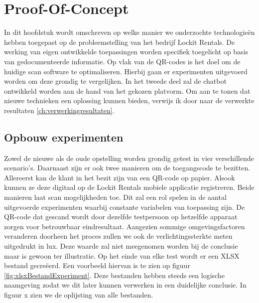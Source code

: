 

\chapter{Proof-Of-Concept}%
\label{ch:Proof-Of-Concept}


In dit hoofdstuk wordt omschreven op welke manier we onderzochte technologieën hebben toegepast op de probleemstelling van het bedrijf Lockit Rentals. De werking van eigen ontwikkelde toepassingen worden specifiek toegelicht op basis van gedocumenteerde informatie. Op vlak van de QR-codes is het doel om de huidige scan software te optimaliseren. Hierbij gaan er experimenten uitgevoerd worden om deze grondig te vergelijken. In het tweede deel zal de chatbot ontwikkeld worden aan de hand van het gekozen platvorm. Om aan te tonen dat nieuwe technieken een oplossing kunnen bieden, verwijs ik door naar de verwerkte resultaten \ref{ch:verwerkingresultaten}.

\section{Opbouw experimenten}%
\label{sec:toepassingenQR-coce scanners}

Zowel de nieuwe als de oude opstelling worden grondig getest in vier verschillende scenario’s. Daarnaast zijn er ook twee manieren om de toegangscode te bezitten. Allereerst kan de klant in het bezit zijn van een QR-code op papier. Alsook kunnen ze deze digitaal op de Lockit Rentals mobiele applicatie registreren. Beide manieren laat scan mogelijkheden toe. Dit zal een rol spelen in de aantal uitgevoerde experimenten waarbij constante variabelen van toepassing zijn. De QR-code dat gescand wordt door dezelfde testpersoon op hetzelfde apparaat zorgen voor betrouwbaar eindresultaat. 
Aangezien sommige omgevingsfactoren veranderen doorheen het proces zullen we ook de verlichtingssterkte meten uitgedrukt in lux. Deze waarde zal niet meegenomen worden bij de conclusie maar is gewoon ter illustratie. 
Op het einde van elke test wordt er een \ac{XLSX} bestand gecreëerd. Een voorbeeld hiervan is te zien op figuur \ref{fig:xlsxBestandExperiment}. Deze bestanden hebben steeds een logische naamgeving zodat we dit later kunnen verwerken in een duidelijke conclusie. In figuur x zien we de oplijsting van alle bestanden.


